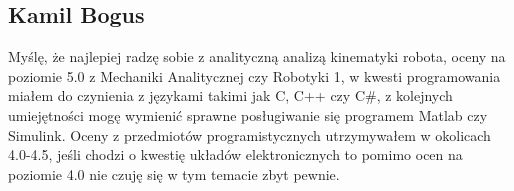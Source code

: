 \subsection{Kamil Bogus}
Myślę, że najlepiej radzę sobie z analityczną analizą kinematyki robota, oceny na poziomie 5.0 z Mechaniki Analitycznej czy Robotyki 1, w kwesti programowania miałem do czynienia z językami takimi jak C, C++ czy C#, z kolejnych umiejętności mogę wymienić sprawne posługiwanie się programem Matlab czy Simulink. Oceny z przedmiotów programistycznych utrzymywałem w okolicach 4.0-4.5, jeśli chodzi o kwestię układów elektronicznych to pomimo ocen na poziomie 4.0 nie czuję się w tym temacie zbyt pewnie.
